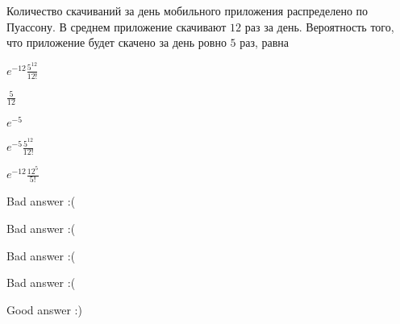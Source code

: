 
\begin{question}
Количество скачиваний за день мобильного приложения распределено по
Пуассону. В среднем приложение скачивают \(12\) раз за день. Вероятность
того, что приложение будет скачено за день ровно \(5\) раз, равна
\begin{answerlist}
  \item \(e^{-12}\frac{5^{12}}{12!}\)
  \item \(\frac{5}{12}\)
  \item \(e^{-5}\)
  \item \(e^{-5}\frac{5^{12}}{12!}\)
  \item \({e}^{-12}\frac{12^5}{5!}\)
\end{answerlist}
\end{question}

\begin{solution}
\begin{answerlist}
  \item Bad answer :(
  \item Bad answer :(
  \item Bad answer :(
  \item Bad answer :(
  \item Good answer :)
\end{answerlist}
\end{solution}

